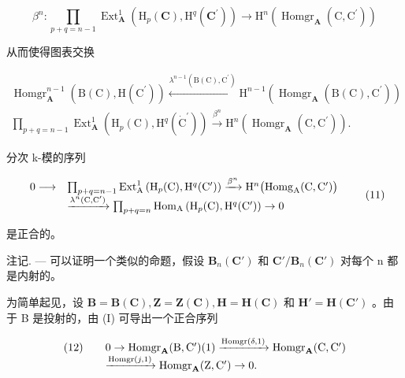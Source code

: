 \[
\beta^ {n}: \prod_ {p + q = n - 1} \operatorname{Ext} _ {\mathbf {A}} ^ {1} \left(\mathrm{H} _ {p} (\mathbf {C}), \mathrm{H} ^ {q} \left(\mathbf {C} ^ {\prime}\right)\right)\rightarrow \mathrm{H} ^ {n} \left(\operatorname{Homgr} _ {\mathbf {A}} \left(\mathrm{C}, \mathrm{C} ^ {\prime}\right)\right)
\]

从而使得图表交换

\[
\begin{array}{c} \operatorname{Homgr} _ {\mathbf {A}} ^ {n - 1} (\mathrm{B} (\mathrm{C}), \mathrm{H} (\mathrm{C} ^ {\prime})) \xleftarrow {\lambda^ {n - 1} (\mathrm{B} (\mathrm{C}) , \mathrm{C} ^ {\prime})} \mathrm{H} ^ {n - 1} (\operatorname{Homgr} _ {\mathbf {A}} (\mathrm{B} (\mathrm{C}), \mathrm{C} ^ {\prime})) \\ \prod_ {p + q = n - 1} \operatorname{Ext} _ {\mathbf {A}} ^ {1} (\mathrm{H} _ {p} (\mathrm{C}), \mathrm{H} ^ {q} (\dot {\mathrm{C}} ^ {\prime})) \xrightarrow {\beta^ {n}} \mathrm{H} ^ {n} (\operatorname{Homgr} _ {\mathbf {A}} (\mathrm{C}, \mathrm{C} ^ {\prime})). \end{array}
\]

分次 k-模的序列

\[
\begin{array}{r l} 0 \longrightarrow & \prod_ {p + q = n - 1} \operatorname{Ext} _ {\mathrm{A}} ^ {1} \left(\mathrm{H} _ {p} (\mathrm{C}), \mathrm{H} ^ {q} (\mathrm{C} ^ {\prime})\right) \xrightarrow {\beta^ {n}} \mathrm{H} ^ {n} \big (\mathrm{Homg} _ {\mathrm{A}} (\mathrm{C}, \mathrm{C} ^ {\prime}) \big) \\ & \xrightarrow {\lambda^ {n} (\mathrm{C} , \mathrm{C} ^ {\prime})} \prod_ {p + q = n} \mathrm{Hom} _ {\mathrm{A}} \left(\mathrm{H} _ {p} (\mathrm{C}), \mathrm{H} ^ {q} (\mathrm{C} ^ {\prime})\right) \to 0 \end{array}\tag{11}
\]

是正合的。

注记. --- 可以证明一个类似的命题，假设 \(\mathbf{B}_{n}(\mathbf{C}')\) 和 \(\mathbf{C}'/\mathbf{B}_{n}(\mathbf{C}')\) 对每个 n 都是内射的。

为简单起见，设 \(\mathbf{B} = \mathbf{B}(\mathbf{C}), \mathbf{Z} = \mathbf{Z}(\mathbf{C}), \mathbf{H} = \mathbf{H}(\mathbf{C})\) 和 \(\mathbf{H}' = \mathbf{H}(\mathbf{C}')\) 。由于 B 是投射的，由 (I) 可导出一个正合序列

\[
\begin{array}{r l}(1 2) \quad&0 \rightarrow \operatorname{Homgr} _ {\mathbf {A}} (\mathrm{B}, \mathrm{C} ^ {\prime}) (1) \xrightarrow {\operatorname{Homgr} (\delta , 1)} \operatorname{Homgr} _ {\mathbf {A}} (\mathrm{C}, \mathrm{C} ^ {\prime})\\&\xrightarrow {\operatorname{Homgr} (j , 1)} \operatorname{Homgr} _ {\mathbf {A}} (\mathrm{Z}, \mathrm{C} ^ {\prime}) \rightarrow 0.\end{array}
\]


